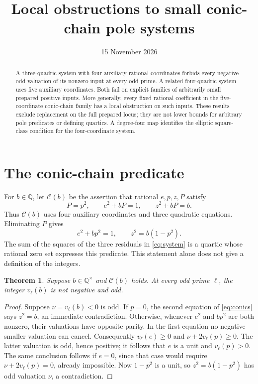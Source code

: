 \documentclass[10pt,a4paper]{article}
\title{Local obstructions to small conic-chain pole systems}
\author{}\date{15 November 2026}
\newtheorem{theorem}{Theorem}[section]
\newcommand{\Q}{\mathbb Q}
\begin{document}
\maketitle
\begin{abstract}
A three-quadric system with four auxiliary rational coordinates
forbids every negative odd valuation of its nonzero input at every odd
prime. A related four-quadric system uses five auxiliary coordinates.
Both fail on explicit families of arbitrarily small prepared positive
inputs. More generally, every fixed rational coefficient in the
five-coordinate conic-chain family has a local obstruction on such
inputs. These results exclude replacement on the full prepared locus;
they are not lower bounds for arbitrary pole predicates or defining
quartics. A degree-four map identifies the elliptic square-class
condition for the four-coordinate system.
\end{abstract}

\section{The conic-chain predicate}
For $b\in\Q$, let $\mathcal C(b)$ be the assertion that rational
$e,p,z,P$ satisfy
\begin{equation}\label{eq:system}
 P=p^2,\qquad e^2+bP=1,\qquad z^2+bP=b.
\end{equation}
Thus $\mathcal C(b)$ uses four auxiliary coordinates and three
quadratic equations. Eliminating $P$ gives
\begin{equation}\label{eq:conics}
 e^2+bp^2=1,\qquad z^2=b(1-p^2).
\end{equation}
The sum of the squares of the three residuals in
\eqref{eq:system} is a quartic whose rational zero set expresses this
predicate. This statement alone does not give a definition of the
integers.

\begin{theorem}\label{thm:odd}
Suppose $b\in\Q^\times$ and $\mathcal C(b)$ holds. At every odd
prime $\ell$, the integer $v_\ell(b)$ is not negative and odd.
\end{theorem}
\begin{proof}
Suppose $\nu=v_\ell(b)<0$ is odd. If $p=0$, the second equation
of \eqref{eq:conics} says $z^2=b$, an immediate contradiction.
Otherwise, whenever $e^2$ and $bp^2$ are both nonzero, their valuations
have opposite parity. In the first equation no negative smaller
valuation can cancel. Consequently $v_\ell(e)\ge0$ and
$\nu+2v_\ell(p)\ge0$. The latter valuation is odd, hence positive;
it follows that $e$ is a unit and $v_\ell(p)>0$.
The same conclusion follows if $e=0$, since that case would require
$\nu+2v_\ell(p)=0$, already impossible. Now $1-p^2$ is a unit,
so $z^2=b(1-p^2)$ has odd valuation $\nu$, a contradiction.
\end{proof}
\end{document}
